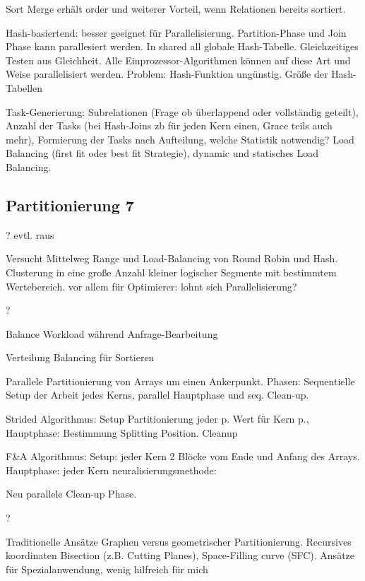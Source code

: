 \documentclass[a4paper,12pt,twoside]{article}
\begin{document}
Sort Merge erhält order und weiterer Vorteil, wenn Relationen bereits sortiert.

Hash-basiertend: besser geeignet für Parallelisierung. Partition-Phase und Join Phase kann parallesiert werden. In shared all globale Hash-Tabelle. Gleichzeitiges Testen aus Gleichheit. Alle Einprozessor-Algorithmen können auf diese Art und Weise parallelisiert werden. Problem: Hash-Funktion ungünstig. Größe der Hash-Tabellen

Task-Generierung: Subrelationen (Frage ob überlappend oder vollständig geteilt), Anzahl der Tasks (bei Hash-Joins zb für jeden Kern einen, Grace teils auch mehr), Formierung der Tasks nach Aufteilung, welche Statistik notwendig? Load Balancing (first fit oder best fit Strategie), dynamic und statisches Load Balancing. 




\subsection{Partitionierung 7}

\textbf{} ? evtl. raus

Versucht Mittelweg Range und Load-Balancing von Round Robin und Hash. Clusterung in eine große Anzahl kleiner logischer Segmente mit bestimmtem Wertebereich. vor allem für Optimierer: lohnt sich Parallelisierung?

\textbf{} ?

Balance Workload während Anfrage-Bearbeitung

\textbf{}

Verteilung Balancing für Sortieren


\textbf{}

Parallele Partitionierung von Arrays um einen Ankerpunkt. Phasen: Sequentielle Setup der Arbeit jedes Kerns, parallel Hauptphase und seq. Clean-up. 

Strided Algorithmus: Setup Partitionierung jeder p. Wert für Kern p., Hauptphase: Bestimmung Splitting Position. Cleanup

F&A Algorithmus: Setup: jeder Kern 2 Blöcke vom Ende und Anfang des Arrays. Hauptphase: jeder Kern neuralisierungsmethode: 

Neu parallele Clean-up Phase. 

\textbf{}?

Traditionelle Ansätze Graphen versus geometrischer Partitionierung. Recursives koordinaten Bisection (z.B. Cutting Planes), Space-Filling curve (SFC). Ansätze für Spezialanwendung, wenig hilfreich für mich
\end{document}
